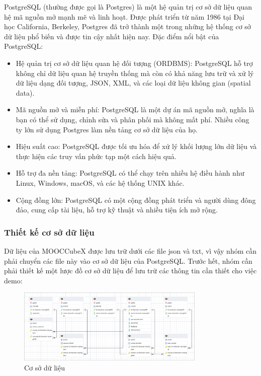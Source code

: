 PostgreSQL (thường được gọi là Postgres) là một hệ quản trị cơ sở dữ liệu quan
hệ mã nguồn mở mạnh mẽ và linh hoạt. Được phát triển từ năm 1986 tại Đại học
California, Berkeley, Postgres đã trở thành một trong những hệ thống cơ sở dữ
liệu phổ biến và được tin cậy nhất hiện nay. Đặc điểm nổi bật của PostgreSQL:
\begin{itemize}
    \item Hệ quản trị cơ sở dữ liệu quan hệ đối tượng (ORDBMS): PostgreSQL hỗ
        trợ không chỉ dữ liệu quan hệ truyền thống mà còn có khả năng lưu trữ và xử lý dữ liệu dạng đối tượng, JSON, XML, và các loại dữ liệu không gian (spatial data).

    \item Mã nguồn mở và miễn phí: PostgreSQL là một dự án mã nguồn mở, nghĩa
        là bạn có thể sử dụng, chỉnh sửa và phân phối mà không mất phí. Nhiều công ty lớn sử dụng Postgres làm nền tảng cơ sở dữ liệu của họ.

    \item Hiệu suất cao: PostgreSQL được tối ưu hóa để xử lý khối lượng lớn dữ
        liệu và thực hiện các truy vấn phức tạp một cách hiệu quả.

    \item Hỗ trợ đa nền tảng: PostgreSQL có thể chạy trên nhiều hệ điều hành
        như Linux, Windows, macOS, và các hệ thống UNIX khác.

    \item Cộng đồng lớn: PostgreSQL có một cộng đồng phát triển và người dùng
        đông đảo, cung cấp tài liệu, hỗ trợ kỹ thuật và nhiều tiện ích mở rộng.
\end{itemize}

\subsubsection{Thiết kế cơ sở dữ liệu}

Dữ liệu của MOOCCubeX được lưu trữ dưới các file json và txt, vì vậy nhóm cần
phải chuyển các file này vào cơ sở dữ liệu của PostgreSQL. Trước hết, nhóm cần phải
thiết kế một lược đồ cơ sở dữ liệu để lưu trữ các thông tin cần thiết cho việc demo:

\begin{figure}[H]
    \centering
    \includegraphics[width=0.8\textwidth]{figures/72.png}
    \caption{Cơ sở dữ liệu}
\end{figure}

